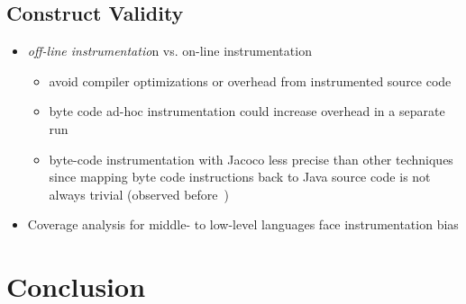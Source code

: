 \subsection{Construct Validity}\label{sec:construct_validity}
\begin{itemize}
	\item \textit{off-line instrumentatio}n vs. on-line instrumentation
	\begin{itemize}
		\item avoid compiler optimizations or overhead from instrumented source code
		\item byte code ad-hoc instrumentation could increase overhead in a separate run
		\item byte-code instrumentation with Jacoco less precise than other techniques since mapping byte code instructions back to Java source code is not always trivial (observed before~\cite{luo_2019_cova})
	\end{itemize}
	\item Coverage analysis for middle- to low-level languages face instrumentation bias
\end{itemize}

\section{Conclusion}
